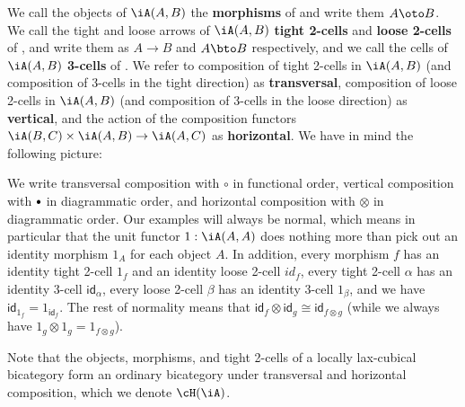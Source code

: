 \documentclass{amsart}
\newcommand{\bcomp}{\mathbin{\raisebox{1pt}{\scriptsize$\bullet$}}}
\let\ocomp\otimes
\renewcommand{\id}{\mathsf{id}}
\begin{document}
We call the objects of $\iA(A,B)$ the \textbf{morphisms} of \iA and write them $A\oto B$.
We call the tight and loose arrows of $\iA(A,B)$ \textbf{tight 2-cells} and \textbf{loose 2-cells} of \iA, and write them as $A\to B$ and $A\bto B$ respectively, and we call the cells of $\iA(A,B)$ \textbf{3-cells} of \iA.
We refer to composition of tight 2-cells in $\iA(A,B)$ (and composition of 3-cells in the tight direction) as \textbf{transversal}, composition of loose 2-cells in $\iA(A,B)$ (and composition of 3-cells in the loose direction) as \textbf{vertical}, and the action of the composition functors $\iA(B,C)\times \iA(A,B) \to \iA(A,C)$ as \textbf{horizontal}.
We have in mind the following picture:
\begin{center}
\end{center}

We write transversal composition with $\circ$ in functional order, vertical composition with $\bcomp $ in diagrammatic order, and horizontal composition with $\ocomp$ in diagrammatic order.
Our examples will always be normal, which means in particular that the unit functor $1:\iA(A,A)$ does nothing more than pick out an identity morphism $1_A$ for each object $A$.
In addition, every morphism $f$ has an identity tight 2-cell $1_f$ and an identity loose 2-cell $id_f$, every tight 2-cell $\alpha$ has an identity 3-cell $\id_\alpha$, every loose 2-cell $\beta$ has an identity 3-cell $1_\beta$, and we have $\id_{1_f} = 1_{\id_f}$.
The rest of normality means that $\id_f \ocomp \id_{g} \cong \id_{f\ocomp g}$ (while we always have $1_g \ocomp 1_g = 1_{f\ocomp g}$).

Note that the objects, morphisms, and tight 2-cells of a locally lax-cubical bicategory \iA form an ordinary bicategory under transversal and horizontal composition, which we denote $\cH(\iA)$.
\end{document}
